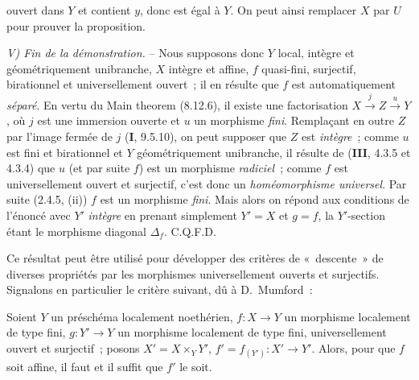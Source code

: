 
ouvert dans $Y$ et contient $y$, donc est égal à $Y$. On peut ainsi remplacer $X$
par $U$ pour prouver la proposition.

\emph{V) Fin de la démonstration.} -- Nous supposons donc $Y$ local, intègre et
géométriquement unibranche, $X$ intègre et affine, $f$ quasi-fini, surjectif,
birationnel et universellement ouvert~; il en résulte que $f$ est automatiquement
\emph{séparé}. En vertu du Main theorem (8.12.6), il existe une factorisation
$X\xrightarrow{j}Z\xrightarrow{u}Y$, où $j$ est une immersion ouverte et $u$ un
morphisme \emph{fini}. Remplaçant en outre $Z$ par l'image fermée de $j$
(\textbf{I}, 9.5.10), on peut supposer que $Z$ est \emph{intègre}~; comme $u$ est
fini et birationnel et $Y$ géométriquement unibranche, il résulte de
(\textbf{III}, 4.3.5 et 4.3.4) que $u$ (et par suite $f$) est un morphisme
\emph{radiciel}~; comme $f$ est universellement ouvert et surjectif, c'est donc un
\emph{homéomorphisme universel}. Par suite (2.4.5, (ii)) $f$ est un morphisme
\emph{fini}. Mais alors on répond aux conditions de l'énoncé avec $Y'$ \emph{intègre}
en prenant simplement $Y'=X$ et $g=f$, la $Y'$-section étant le morphisme diagonal
$\Delta_f$. C.Q.F.D.

Ce résultat peut être utilisé pour développer des critères de «~descente~» de
diverses propriétés par les morphismes universellement ouverts et surjectifs.
Signalons en particulier le critère suivant, dû à D.~Mumford~:

\begin{corollary}[14.5.11]
\label{IV.14.5.11-fr}
Soient $Y$ un préschéma localement noethérien, $f:X\to Y$ un morphisme localement
de type fini, $g:Y'\to Y$ un morphisme localement de type fini, universellement
ouvert et surjectif~; posons $X'=X\times_Y Y'$, $f'=f_{(Y')}:X'\to Y'$. Alors,
pour que $f$ soit affine, il faut et il suffit que $f'$ le soit.
\end{corollary}

